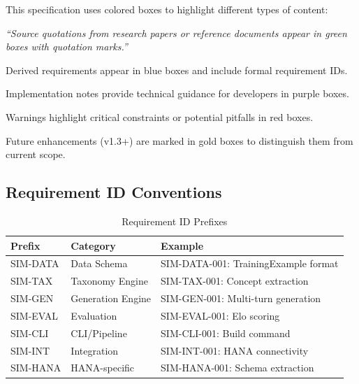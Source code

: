\documentclass[12pt,a4paper,twoside]{report}
\begin{document}
This specification uses colored boxes to highlight different types of content:

\begin{sourcequote}
\textit{``Source quotations from research papers or reference documents appear in green boxes with quotation marks.''}
\end{sourcequote}

\begin{requirement}
Derived requirements appear in blue boxes and include formal requirement IDs.
\end{requirement}

\begin{implnote}
Implementation notes provide technical guidance for developers in purple boxes.
\end{implnote}

\begin{warningbox}
Warnings highlight critical constraints or potential pitfalls in red boxes.
\end{warningbox}

\begin{futurebox}
Future enhancements (v1.3+) are marked in gold boxes to distinguish them from current scope.
\end{futurebox}

\subsection*{Requirement ID Conventions}

\begin{table}[h]
\centering
\begin{tabular}{@{}llp{6cm}@{}}
\toprule
\textbf{Prefix} & \textbf{Category} & \textbf{Example} \\
\midrule
SIM-DATA & Data Schema & SIM-DATA-001: TrainingExample format \\
SIM-TAX & Taxonomy Engine & SIM-TAX-001: Concept extraction \\
SIM-GEN & Generation Engine & SIM-GEN-001: Multi-turn generation \\
SIM-EVAL & Evaluation & SIM-EVAL-001: Elo scoring \\
SIM-CLI & CLI/Pipeline & SIM-CLI-001: Build command \\
SIM-INT & Integration & SIM-INT-001: HANA connectivity \\
SIM-HANA & HANA-specific & SIM-HANA-001: Schema extraction \\
\bottomrule
\end{tabular}
\caption{Requirement ID Prefixes}
\end{table}
\end{document}
